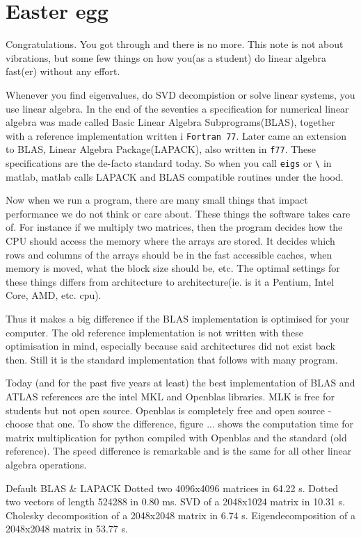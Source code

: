 
\chapter{Easter egg}
\label{chap:easter_egg}

Congratulations. You got through and there is no more. This note is not about
vibrations, but some few things on how you(as a student) do linear algebra
fast(er) without any effort.

Whenever you find eigenvalues, do SVD decompistion or solve linear systems, you
use linear algebra. In the end of the seventies a specification for numerical
linear algebra was made called Basic Linear Algebra Subprograms(BLAS), together
with a reference implementation written i \texttt{Fortran 77}. Later came an
extension to BLAS, Linear Algebra Package(LAPACK), also written in \texttt{f77}.
These specifications are the de-facto standard today. So when you call
\texttt{eigs} or \texttt{\textbackslash} in matlab, matlab calls LAPACK and BLAS
compatible routines under the hood.

Now when we run a program, there are many small things that impact performance
we do not think or care about. These things the software takes care of. For
instance if we multiply two matrices, then the program decides how the CPU
should access the memory where the arrays are stored. It decides which rows and
columns of the arrays should be in the fast accessible caches, when memory is
moved, what the block size should be, etc. The optimal settings for these things
differs from architecture to architecture(ie. is it a Pentium, Intel Core, AMD,
etc. cpu).

Thus it makes a big difference if the BLAS implementation is optimised for your
computer. The old reference implementation is not written with these
optimisation in mind, especially because said architectures did not exist back
then. Still it is the standard implementation that follows with many program.

Today (and for the past five years at least) the best implementation of BLAS and
ATLAS references are the intel MKL and Openblas libraries. MLK is free for
students but not open source. Openblas is completely free and open source -
choose that one. To show the difference, figure ... shows the computation time
for matrix multiplication for python compiled with Openblas and the standard
(old reference). The speed difference is remarkable and is the same for all
other linear algebra operations.

Default BLAS \& LAPACK
Dotted two 4096x4096 matrices in 64.22 s.
Dotted two vectors of length 524288 in 0.80 ms.
SVD of a 2048x1024 matrix in 10.31 s.
Cholesky decomposition of a 2048x2048 matrix in 6.74 s.
Eigendecomposition of a 2048x2048 matrix in 53.77 s.

